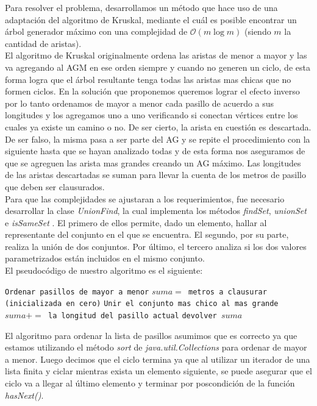 Para resolver el problema, desarrollamos un método que hace uso de una adaptación del algoritmo de Kruskal, mediante el cuál es posible encontrar un árbol generador máximo con una complejidad de $\mathcal{O}(m\log{}m)$ (siendo $m$ la cantidad de aristas).\\
El algoritmo de Kruskal originalmente ordena las aristas de menor a mayor y las va agregando al AGM en ese orden siempre y cuando no generen un ciclo, de esta forma logra que el árbol resultante tenga todas las aristas mas chicas que no formen ciclos. En la solución que proponemos queremos lograr el efecto inverso por lo tanto ordenamos de mayor a menor cada pasillo de acuerdo a sus longitudes y los agregamos uno a uno verificando si conectan vértices entre los cuales ya existe un camino o no. De ser cierto, la arista en cuestión es descartada. De ser falso, la misma pasa a ser parte del AG y se repite el procedimiento con la siguiente hasta que se hayan analizado todas y de esta forma nos aseguramos de que se agreguen las arista mas grandes creando un AG máximo. Las longitudes de las aristas descartadas se suman para llevar la cuenta de los metros de pasillo que deben ser clausurados. \label{agm}\\

Para que las complejidades se ajustaran a los requerimientos, fue necesario desarrollar la clase \textit{UnionFind}, la cual implementa los métodos \textit{findSet}, \textit{unionSet} e \textit{isSameSet} . El primero de ellos permite, dado un elemento, hallar al representante del conjunto en el que se encuentra. El segundo, por su parte, realiza la unión de dos conjuntos. Por último, el tercero analiza si los dos valores parametrizados están incluidos en el mismo conjunto. \\

El pseudocódigo de nuestro algoritmo es el siguiente:

\begin{algorithmic} 

\STATE \texttt{Ordenar pasillos de mayor a menor}
\STATE \texttt{$suma = $ metros a clausurar (inicializada en cero)}
		\STATE \texttt{Unir el conjunto mas chico al mas grande}
	\ELSE
		\STATE \texttt{$suma += $ la longitud del pasillo actual}
	\ENDIF
\ENDFOR
\STATE \texttt{devolver $suma$}
\end{algorithmic} 


El algoritmo para ordenar la lista de pasillos asumimos que es correcto ya que estamos utilizando el método \textit{sort} de \emph{java.util.Collections} para ordenar de mayor a menor. Luego decimos que el ciclo termina ya que al utilizar un iterador de una lista finita y ciclar mientras exista un elemento siguiente, se puede asegurar que el ciclo va a llegar al último elemento y terminar por poscondición de la función \textit{hasNext()}.\\

